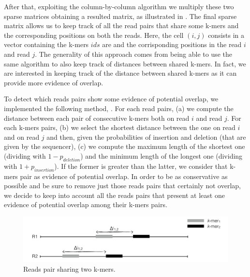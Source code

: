 \documentclass[11pt]{article}
\begin{document}
After that, exploiting the column-by-column algorithm we multiply these two sparse matrices obtaining a resulted matrix, as illustrated in .
The final sparse matrix allows us to keep track of all the read pairs that share some k-mers and the corresponding positions on both the reads.
Here, the cell $(i,j)$ consists in a vector containing the k-mers $ids$ are and the corrisponding positions in the read $i$ and read $j$. 
The generality of this approach comes from being able to use the same algorithm to also keep track of distances between shared k-mers. 
In fact, we are interested in keeping track of the distance between shared k-mers as it can provide more evidence of overlap.

To detect which reads pairs show some evidence of potential overlap, we implemented the following method, . 
For each read pairs, (a) we compute the distance between each pair of consecutive k-mers both on read $i$ and read $j$.
For each k-mers pairs, (b) we select the shortest distance between the one on read $i$ and on read $j$ and then, given the probabilities of insertion and deletion (that are given by the sequencer), (c) we compute the maximum length of the shortest one (dividing with $1-p_{deletion}$) and the minimum length of the longest one (dividing with $1+p_{insertion}$).
If the former is greater than the latter, we consider that k-mers pair as evidence of potential overlap.
In order to be as conservative as possible and be sure to remove just those reads pairs that certainly not overlap, we decide to keep into account all the reads pairs that present at least one evidence of potential overlap among their k-mers pairs.
\begin{figure}
    \centering
    \includegraphics[width=\textwidth]{image/detect.png}
    \caption{Reads pair sharing two k-mers.}
    \label{fig:detect}
\end{figure}
\end{document}
